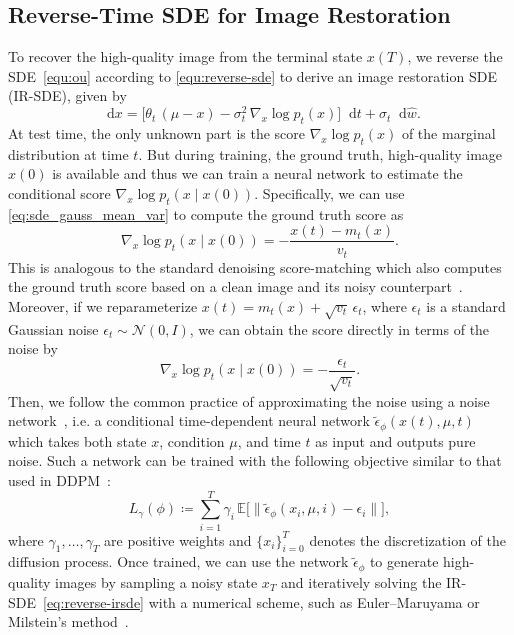 \documentclass{article}
\newcommand{\diff}{\mathop{}\!\mathrm{d}}
\newcommand{\cond}{{\;|\;}}
\theoremstyle{plain}
\theoremstyle{definition}
\theoremstyle{remark}
\begin{document}
 

\subsection{Reverse-Time SDE for Image Restoration}

To recover the high-quality image from the terminal state ${x}(T)$, we reverse the SDE~\eqref{equ:ou} according to \eqref{equ:reverse-sde} to derive an image restoration SDE (IR-SDE), given by
\begin{equation}
    \diff {x} = \big[ \theta_t \, (\mu - {x}) - \sigma_t^2 \, \nabla_{{x}} \log p_t({x}) \big] \diff t + \sigma_t \diff \hat{w}.
    \label{eq:reverse-irsde}
\end{equation}
At test time, the only unknown part is the score $\nabla_{{x}} \log p_t({x})$ of the marginal distribution at time $t$. But during training, the ground truth, high-quality image ${x}(0)$ is available and thus we can train a neural network to estimate the conditional score $\nabla_{{x}} \log p_t({x} \cond {x}(0))$. Specifically, we can use \eqref{eq:sde_gauss_mean_var} to compute the ground truth score as
\begin{equation}
    \nabla_{{x}}\log p_t({x} \cond {x}(0)) = - \frac{{x}(t) - m_{t}({x})}{v_{t}}.
    \label{eq:score}
\end{equation}
This is analogous to the standard denoising score-matching which also computes the ground truth score based on a clean image and its noisy counterpart~\cite{hyvarinen2005estimation}. Moreover, if we reparameterize ${x}(t) = m_{t}({x}) + \sqrt{v_{t}} \, \epsilon_t$, where $\epsilon_t$ is a standard Gaussian noise $\epsilon_t \sim \mathcal{N}(0, I)$, we can obtain the score directly in terms of the noise by
\begin{equation}
    \nabla_{{x}}\log p_t({x} \cond {x}(0)) = - \frac{\epsilon_t}{\sqrt{v_t}}.
    \label{eq:noise2score}
\end{equation}
Then, we follow the common practice of approximating the noise using a noise network~\cite{ho2020denoising}, i.e. a conditional time-dependent neural network $\tilde{\epsilon}_{\phi}({x}(t), \mu, t)$ which takes both state $x$, condition $\mu$, and time $t$ as input and outputs pure noise. Such a network can be trained with the following objective similar to that used in DDPM~\cite{ho2020denoising}:
\begin{equation}
    L_{\gamma}(\phi) \coloneqq \sum_{i=1}^T \gamma_i \, \mathbb{E} \Big[ \big\lVert \tilde{\epsilon}_\phi({x}_{i}, \mu, i) - \epsilon_{i} \bigr\rVert\Big],
    \label{eq:noise_objective}
\end{equation}
where $\gamma_1, \ldots, \gamma_T$ are positive weights and $\{{x}_i\}_{i=0}^T$ denotes the discretization of the diffusion process. Once trained, we can use the network $\tilde{\epsilon}_{\phi}$ to generate high-quality images by sampling a noisy state ${x}_T$ and iteratively solving the IR-SDE~\eqref{eq:reverse-irsde} with a numerical scheme, such as Euler--Maruyama or Milstein's method~\cite{mil1975approximate}.
\end{document}
